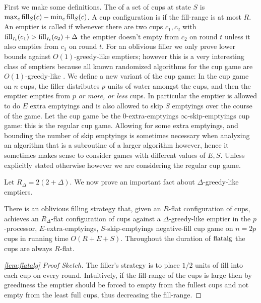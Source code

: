 First we make some definitions. The  of a set of
cups at state $S$ is $\max_c \operatorname{\text{\textup{fill}}}_S(c) - \min_c \operatorname{\text{\textup{fill}}}_S(c)$. A cup
configuration is  if the fill-range is at most
$R$. An emptier is called  if whenever
there are two cups $c_1, c_2$ with $\operatorname{\text{\textup{fill}}}_{I_t}(c_1) >
\operatorname{\text{\textup{fill}}}_{I_t}(c_2) + \Delta$ the emptier doesn't empty from $c_2$ on
round $t$ unless it also empties from $c_1$ on round $t$. For an
oblivious filler we only prove lower bounds against
$O(1)$-greedy-like emptiers; however this is a very interesting
class of emptiers because all known randomized algorithms for the
cup game are $O(1)$-greedy-like \cite{BenderFaKu19, Kuszmaul20}. We define a
new variant of the cup game: In the 
 cup game on $n$ cups, the filler
distributes $p$ units of water amongst the cups, and then the
emptier empties from $p$ \textit{or more, or less} cups. In
particular the emptier is allowed to do $E$ extra emptyings and
is also allowed to skip $S$ emptyings over the course of the
game. Let the  cup game be the $0$-extra-emptyings
$\infty$-skip-emptyings cup game: this is the regular cup game.
Allowing for some extra emptyings, and bounding the number of
skip emptyings is sometimes necessary when analyzing an algorithm
that is a subroutine of a larger algorithm however, hence it
sometimes makes sense to consider games with different values of
$E,S$. Unless explicitly stated otherwise however we are
considering the regular cup game.

Let $R_\Delta = 2(2+\Delta)$.
We now prove an important fact about $\Delta$-greedy-like emptiers.
\begin{lemma}
  \label{lem:TO_flatalg}
  There is an oblivious filling strategy  that,
  given an $R$-flat configuration of cups, achieves an
  $R_\Delta$-flat configuration of cups against a
  $\Delta$-greedy-like emptier in the $p$-processor,
  $E$-extra-emptyings, $S$-skip-emptyings negative-fill cup game
  on $n=2p$ cups in running time $O(R+E+S)$. Throughout the
  duration of $\operatorname{\text{\textup{flatalg}}}$ the cups are always $R$-flat.
\end{lemma}
\begin{proof}[\cref{lem:flatalg} Proof Sketch]
  The filler's strategy is to place $1/2$ units of fill into each
  cup on every round.
  Intuitively, if the fill-range of the cups is large then by
  greediness the emptier should be forced to empty from the
  fullest cups and not empty from the least full cups, thus
  decreasing the fill-range.
\end{proof}

